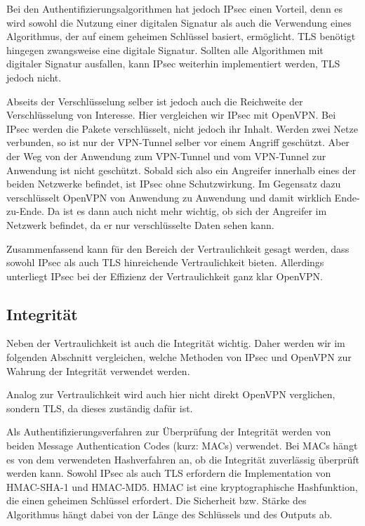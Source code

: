 \documentclass[12pt]{scrartcl}
\begin{document}
Bei den Authentifizierungsalgorithmen hat jedoch IPsec einen Vorteil, denn es wird sowohl die Nutzung einer digitalen Signatur als auch die Verwendung eines Algorithmus, der auf einem geheimen Schlüssel basiert, ermöglicht. TLS benötigt hingegen zwangsweise eine digitale Signatur. Sollten alle Algorithmen mit digitaler Signatur ausfallen, kann IPsec weiterhin implementiert werden, TLS jedoch nicht.\cite{Alshamsi2005}

Abseits der Verschlüsselung selber ist jedoch auch die Reichweite der Verschlüsselung von Interesse. Hier vergleichen wir IPsec mit OpenVPN. Bei IPsec werden die Pakete verschlüsselt, nicht jedoch ihr Inhalt. Werden zwei Netze verbunden, so ist nur der VPN-Tunnel selber vor einem Angriff geschützt. Aber der Weg von der Anwendung zum VPN-Tunnel und vom VPN-Tunnel zur Anwendung ist nicht geschützt. Sobald sich also ein Angreifer innerhalb eines der beiden Netzwerke befindet, ist IPsec ohne Schutzwirkung.
Im Gegensatz dazu verschlüsselt OpenVPN von Anwendung zu Anwendung und damit wirklich Ende-zu-Ende. Da ist es dann auch nicht mehr wichtig, ob sich der Angreifer im Netzwerk befindet, da er nur verschlüsselte Daten sehen kann.\cite{Sun2011}

Zusammenfassend kann für den Bereich der Vertraulichkeit gesagt werden, dass sowohl IPsec als auch TLS hinreichende Vertraulichkeit bieten. Allerdings unterliegt IPsec bei der Effizienz der Vertraulichkeit ganz klar OpenVPN.

\subsection{Integrität}
Neben der Vertraulichkeit ist auch die Integrität wichtig. Daher werden wir im folgenden Abschnitt vergleichen, welche Methoden von IPsec und OpenVPN zur Wahrung der Integrität verwendet werden.

Analog zur Vertraulichkeit wird auch hier nicht direkt OpenVPN verglichen, sondern TLS, da dieses zuständig dafür ist.

Als Authentifizierungsverfahren zur Überprüfung der Integrität werden von beiden Message Authentication Codes (kurz: MACs) verwendet. Bei MACs hängt es von dem verwendeten Hashverfahren an, ob die Integrität zuverlässig überprüft werden kann. Sowohl IPsec als auch TLS erfordern die Implementation von HMAC-SHA-1 und HMAC-MD5. HMAC ist eine kryptographische Hashfunktion, die einen geheimen Schlüssel erfordert. Die Sicherheit bzw. Stärke des Algorithmus hängt dabei von der Länge des Schlüssels und des Outputs ab.\cite{Alshamsi2005}
\end{document}
